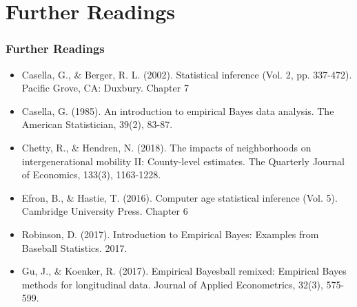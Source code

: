 \documentclass[
  shownotes,
  xcolor={svgnames},
  hyperref={colorlinks,citecolor=DarkBlue,linkcolor=DarkRed,urlcolor=DarkBlue}
  ]{beamer}
\begin{document}
\section{Further Readings}
\begin{frame}
\frametitle{Further Readings}
\footnotesize
\begin{itemize}
  \item Casella, G., \& Berger, R. L. (2002). Statistical inference (Vol. 2, pp. 337-472). Pacific Grove, CA: Duxbury. Chapter 7
  \medskip
  \item Casella, G. (1985). An introduction to empirical Bayes data analysis. The American Statistician, 39(2), 83-87.
  \medskip
   \item Chetty, R., \& Hendren, N. (2018). The impacts of neighborhoods on intergenerational mobility II: County-level estimates. The Quarterly Journal of Economics, 133(3), 1163-1228.
  \medskip
  \item Efron, B., \& Hastie, T. (2016). Computer age statistical inference (Vol. 5). Cambridge University Press. Chapter 6
  \medskip
  \item Robinson, D. (2017). Introduction to Empirical Bayes: Examples from Baseball Statistics. 2017.
  \medskip
  \item Gu, J., \& Koenker, R. (2017). Empirical Bayesball remixed: Empirical Bayes methods for longitudinal data. Journal of Applied Econometrics, 32(3), 575-599.
  
\end{itemize}

\end{frame}

\end{document}
